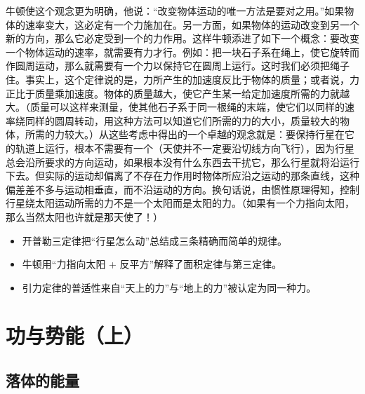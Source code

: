 牛顿使这个观念更为明确，他说：“改变物体运动的唯一方法是要对之用。”如果物体的速率变大，这必定有一个力施加在。另一方面，如果物体的运动改变到另一个新的方向，那么它必定受到一个的力作用。这样牛顿添进了如下一个概念：要改变一个物体运动的速率，就需要有力才行。例如：把一块石子系在绳上，使它旋转而作圆周运动，那么就需要有一个力以保持它在圆周上运行。这时我们必须把绳子住。事实上，这个定律说的是，力所产生的加速度反比于物体的质量；或者说，力正比于质量乘加速度。物体的质量越大，使它产生某一给定加速度所需的力就越大。（质量可以这样来测量，使其他石子系于同一根绳的末端，使它们以同样的速率绕同样的圆周转动，用这种方法可以知道它们所需的力的大小，质量较大的物体，所需的力较大。）从这些考虑中得出的一个卓越的观念就是：要保持行星在它的轨道上运行，根本不需要有一个（天使并不一定要沿切线方向飞行），因为行星总会沿所要求的方向运动，如果根本没有什么东西去干扰它，那么行星就将沿运行下去。但实际的运动却偏离了不存在力作用时物体所应沿之运动的那条直线，这种偏差差不多与运动相垂直，而不沿运动的方向。换句话说，由惯性原理得知，控制行星绕太阳运动所需的力不是一个太阳而是太阳的力。（如果有一个力指向太阳，那么当然太阳也许就是那天使了！）

\begin{summarybox}[本节要点]
  \begin{itemize}
    \item 开普勒三定律把“行星怎么动”总结成三条精确而简单的规律。
    \item 牛顿用“力指向太阳 + 反平方”解释了面积定律与第三定律。
    \item 引力定律的普适性来自“天上的力”与“地上的力”被认定为同一种力。
  \end{itemize}
\end{summarybox}

\clearpage

\setcounter{chapter}{12}
\chapter{功与势能（上）}


\section{落体的能量}

